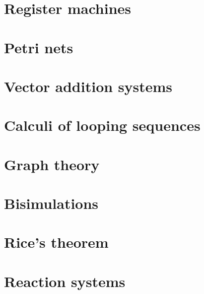 
\section{Register machines} %
\label{sec:register_machines}



\section{Petri nets} %
\label{sec:petri_nets}



\section{Vector addition systems} %
\label{sec:vector_addition_systems}



\section{Calculi of looping sequences} %
\label{sec:calculi_of_looping_sequences}



\section{Graph theory} %
\label{sec:graph_theory}



\section{Bisimulations} %
\label{sec:bisimulations}


\section{Rice's theorem} %
\label{sec:rice_s_theorem}


\section{Reaction systems} %
\label{sec:reaction_systems}

